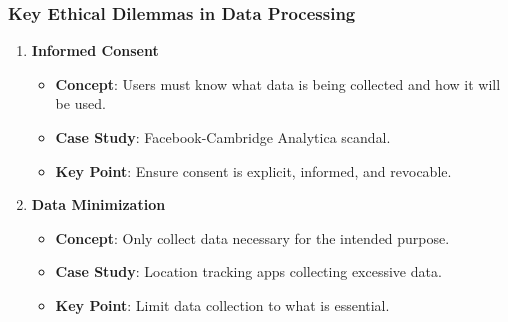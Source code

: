 \documentclass{beamer}
\begin{document}
\begin{frame}[fragile]
    \frametitle{Key Ethical Dilemmas in Data Processing}
    \begin{enumerate}
        \item \textbf{Informed Consent}
        \begin{itemize}
            \item \textbf{Concept}: Users must know what data is being collected and how it will be used.
            \item \textbf{Case Study}: Facebook-Cambridge Analytica scandal.
            \item \textbf{Key Point}: Ensure consent is explicit, informed, and revocable.
        \end{itemize}

        \item \textbf{Data Minimization}
        \begin{itemize}
            \item \textbf{Concept}: Only collect data necessary for the intended purpose.
            \item \textbf{Case Study}: Location tracking apps collecting excessive data.
            \item \textbf{Key Point}: Limit data collection to what is essential.
        \end{itemize}
    \end{enumerate}
\end{frame}
\end{document}
